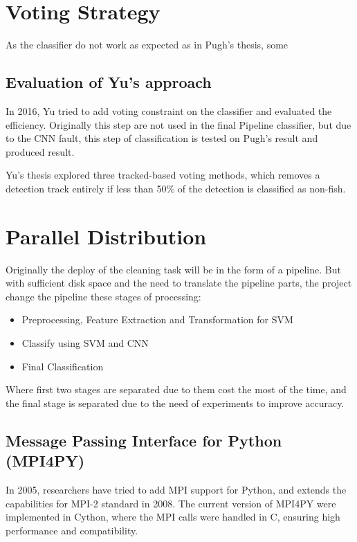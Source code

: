 \documentclass[bsc,logo,twoside,fullspacing,parskip]{infthesis}
\begin{document}
\chapter{Voting Strategy}
\label{chap:voting}

As the classifier do not work as expected as in Pugh's thesis, some 

\section{Evaluation of Yu's approach}

In 2016, Yu tried to add voting constraint on the classifier and evaluated the efficiency. Originally this step are not used in the final Pipeline classifier, but due to the CNN fault, this step of classification is tested on Pugh's result and produced \underline{\hspace{40pt}} result.

Yu's thesis explored three tracked-based voting methods, which removes a detection track entirely if less than 50\% of the detection is classified as non-fish.

\chapter{Parallel Distribution}
\label{chap:parallel}

Originally the deploy of the cleaning task will be in the form of a pipeline.
But with sufficient disk space and the need to translate the pipeline parts, the project change the pipeline these stages of processing:

\begin{itemize}
   \setlength{\parskip}{3pt}
   \item Preprocessing, Feature Extraction and Transformation for SVM
   \item Classify using SVM and CNN
   \item Final Classification
\end{itemize}
Where first two stages are separated due to them cost the most of the time, and the final stage is separated due to the need of experiments to improve accuracy.

\section{Message Passing Interface for Python (MPI4PY)}

In 2005, researchers have tried to add MPI support for Python\cite{MPI4PY}, and extends the capabilities for MPI-2 standard in 2008\cite{MPI4PY2}. The current version of MPI4PY\cite{MPI4PY3} were implemented in Cython, where the MPI calls were handled in C, ensuring high performance and compatibility.
\end{document}
